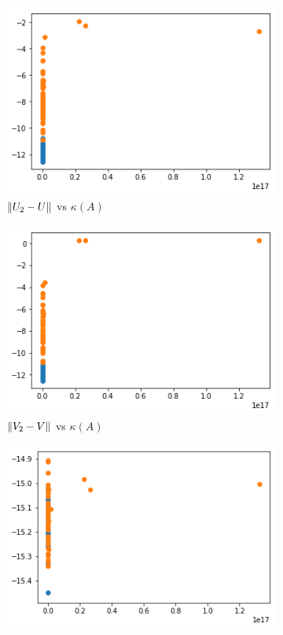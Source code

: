 \documentclass[10pt]{article}
\begin{document}
\begin{solution}[Solution]
\begin{enumerate}
        \begin{figure}[H]\centering
            \begin{subfigure}{.45\textwidth}\centering
                \includegraphics[width=.9\textwidth]{img/U2U.png}
                \caption{\(\left\lVert U_2-U\right\rVert\) vs \( \kappa(A) \)}
            \end{subfigure}            
            \begin{subfigure}{.45\textwidth}\centering
                \includegraphics[width=.9\textwidth]{img/V2V.png}
                \caption{\(\left\lVert V_2-V\right\rVert\) vs \( \kappa(A) \)}
            \end{subfigure}            
            \begin{subfigure}{.45\textwidth}\centering
                \includegraphics[width=.9\textwidth]{img/S2S.png}

\end{subfigure}
\end{figure}
\end{enumerate}
\end{solution}
\end{document}
